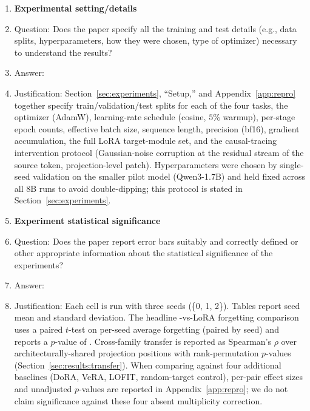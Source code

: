\begin{enumerate}
\item {\bf Experimental setting/details}
    \item[] Question: Does the paper specify all the training and test details (e.g., data splits, hyperparameters, how they were chosen, type of optimizer) necessary to understand the results?
    \item[] Answer: \answerYes{}
    \item[] Justification: Section~\ref{sec:experiments}, ``Setup,'' and Appendix~\ref{app:repro} together specify train/validation/test splits for each of the four tasks, the optimizer (AdamW), learning-rate schedule (cosine, $5\%$ warmup), per-stage epoch counts, effective batch size, sequence length, precision (bf16), gradient accumulation, the full LoRA target-module set, and the causal-tracing intervention protocol (Gaussian-noise corruption at the residual stream of the source token, projection-level patch). Hyperparameters were chosen by single-seed validation on the smaller pilot model (Qwen3-1.7B) and held fixed across all 8B runs to avoid double-dipping; this protocol is stated in Section~\ref{sec:experiments}.

\item {\bf Experiment statistical significance}
    \item[] Question: Does the paper report error bars suitably and correctly defined or other appropriate information about the statistical significance of the experiments?
    \item[] Answer: \answerYes{}
    \item[] Justification: Each cell is run with three seeds (\{0, 1, 2\}). Tables report seed mean and standard deviation. The headline \tglora{}-vs-LoRA forgetting comparison uses a paired $t$-test on per-seed average forgetting (paired by seed) and reports a $p$-value of . Cross-family \fvs{} transfer is reported as Spearman's $\rho$ over architecturally-shared projection positions with rank-permutation $p$-values (Section~\ref{sec:results:transfer}). When comparing \tglora{} against four additional baselines (DoRA, VeRA, LOFIT, random-target control), per-pair effect sizes and unadjusted $p$-values are reported in Appendix~\ref{app:repro}; we do not claim significance against these four absent multiplicity correction.


\end{enumerate}
